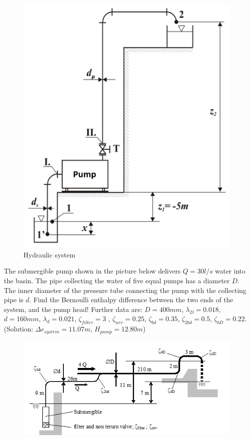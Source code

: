 \begin{figure}[ht]
\begin{center}
\includegraphics[scale=0.75]{figs/problem_3p3p34_hyd_sys_fig.png}
\caption{\label{gen_hs}Hydraulic system}
\end{center}
\end{figure}
\vspace{1cm}

The submergible pump shown in the picture below delivers $Q = 30 l/s$ water into the basin. The pipe collecting the water of five equal pumps has a diameter $D$. The inner diameter of the pressure tube connecting the pump with the collecting pipe is $d$. Find the Bernoulli enthalpy difference between the two ends of the system, and the pump head! Further data are: $D = 400 mm$, $\lambda_D = 0.018$, $d = 160 mm$, $\lambda_d = 0.021$, $\zeta_{filter} = 3$ , $\zeta_{nrv}=0.25$, $\zeta_{bd} = 0.35$, $\zeta_{2bd} = 0.5$, $\zeta_{bD} = 0.22$. (Solution: $\Delta e_{system}=11.07m$, $H_{pump}=12.80m$)
% 
\begin{figure}[ht]
\begin{center}
\includegraphics{Problem_solving/figs/PS_HydraulicSystems_Submergible.png}
\end{center}
\end{figure}

